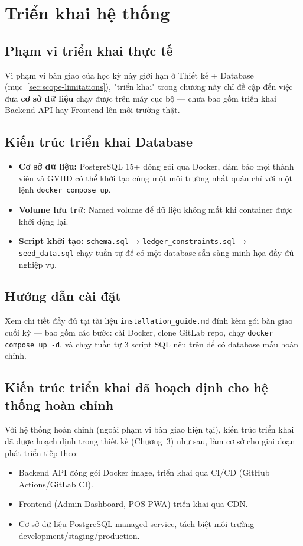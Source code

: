 \section{Triển khai hệ thống}

\subsection{Phạm vi triển khai thực tế}
Vì phạm vi bàn giao của học kỳ này giới hạn ở Thiết kế + Database (mục~\ref{sec:scope-limitations}), "triển khai" trong chương này chỉ đề cập đến việc đưa \textbf{cơ sở dữ liệu} chạy được trên máy cục bộ — chưa bao gồm triển khai Backend API hay Frontend lên môi trường thật.

\subsection{Kiến trúc triển khai Database}
\begin{itemize}
    \item \textbf{Cơ sở dữ liệu:} PostgreSQL 15+ đóng gói qua Docker, đảm bảo mọi thành viên và GVHD có thể khởi tạo cùng một môi trường nhất quán chỉ với một lệnh \texttt{docker compose up}.
    \item \textbf{Volume lưu trữ:} Named volume để dữ liệu không mất khi container được khởi động lại.
    \item \textbf{Script khởi tạo:} \texttt{schema.sql} → \texttt{ledger\_constraints.sql} → \texttt{seed\_data.sql} chạy tuần tự để có một database sẵn sàng minh họa đầy đủ nghiệp vụ.
\end{itemize}

\subsection{Hướng dẫn cài đặt}
Xem chi tiết đầy đủ tại tài liệu \texttt{installation\_guide.md} đính kèm gói bàn giao cuối kỳ — bao gồm các bước: cài Docker, clone GitLab repo, chạy \texttt{docker compose up -d}, và chạy tuần tự 3 script SQL nêu trên để có database mẫu hoàn chỉnh.

\subsection{Kiến trúc triển khai đã hoạch định cho hệ thống hoàn chỉnh}
Với hệ thống hoàn chỉnh (ngoài phạm vi bàn giao hiện tại), kiến trúc triển khai đã được hoạch định trong thiết kế (Chương~3) như sau, làm cơ sở cho giai đoạn phát triển tiếp theo:
\begin{itemize}
    \item Backend API đóng gói Docker image, triển khai qua CI/CD (GitHub Actions/GitLab CI).
    \item Frontend (Admin Dashboard, POS PWA) triển khai qua CDN.
    \item Cơ sở dữ liệu PostgreSQL managed service, tách biệt môi trường development/staging/production.
\end{itemize}
